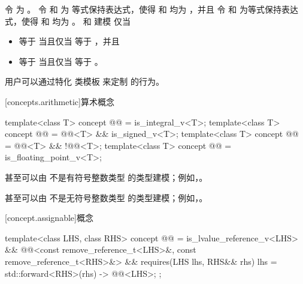 \begin{itemdescr}
\pnum
令  为 。
令  和  为
等式保持表达式，使得
 和  均为 ，并且
令  和  为等式保持表达式，使得
 和  均为 。
 和  建模 
仅当
\begin{itemize}
\item {} 等于  当且仅当
   等于 ，并且
\item {} 等于  当且仅当
   等于 。
\end{itemize}

\pnum
\begin{note}
用户可以通过特化
 类模板 来定制  的行为。
\end{note}

\end{itemdescr}

[concepts.arithmetic]{算术概念}

\begin{itemdecl}
template<class T>
  concept @@ = is_integral_v<T>;
template<class T>
  concept @@ = @@<T> && is_signed_v<T>;
template<class T>
  concept @@ = @@<T> && !@@<T>;
template<class T>
  concept @@ = is_floating_point_v<T>;
\end{itemdecl}

\begin{itemdescr}
\pnum
\begin{note}
 甚至可以由
不是有符号整数类型 的类型建模；例如，。
\end{note}

\pnum
\begin{note}
 甚至可以由
不是无符号整数类型 的类型建模；例如，。
\end{note}
\end{itemdescr}

[concept.assignable]{概念 }

\begin{itemdecl}
template<class LHS, class RHS>
  concept @@ =
    is_lvalue_reference_v<LHS> &&
    @@<const remove_reference_t<LHS>&, const remove_reference_t<RHS>&> &&
    requires(LHS lhs, RHS&& rhs) {
      { lhs = std::forward<RHS>(rhs) } -> @@<LHS>;
    };
\end{itemdecl}

